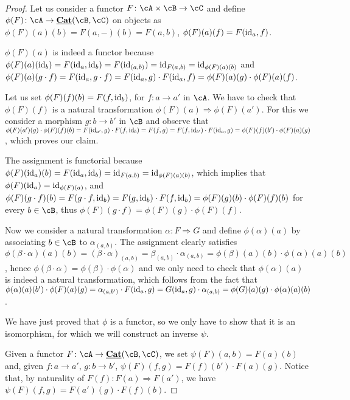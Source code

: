 \documentclass[a4paper,11pt,openany]{scrartcl}
\begin{document}
~\\
\begin{proof}
    Let us consider a functor $F\colon\cA\times\cB\rightarrow\cC$ and define
    $\phi(F)\colon\cA\rightarrow\underline{\Cat}(\cB,\cC)$ on objects as
    $\phi(F)(a)(b)=F(a,-)(b)=F(a,b)$, $\phi(F)(a)(f)=F(\operatorname{id}_a,f)$.

    $\phi(F)(a)$ is indeed a functor because
    $\phi(F)(a)(\operatorname{id}_b)=F(\operatorname{id}_a,\operatorname{id}_b)=F(\operatorname{id}_{(a,b)})=\operatorname{id}_{F(a,b)}=\operatorname{id}_{\phi(F)(a)(b)}$ and
    $\phi(F)(a)(g\cdot f)=F(\operatorname{id}_a,g\cdot f)=F(\operatorname{id}_a,g)\cdot
    F(\operatorname{id}_a,f)=\phi(F)(a)(g)\cdot\phi(F)(a)(f)$.

    Let us set $\phi(F)(f)(b)=F(f,\operatorname{id}_b)$, for $f\colon
    a\rightarrow a'$ in $\cA$. We have to check
    that $\phi(F)(f)$ is a natural transformation
    $\phi(F)(a)\Rightarrow\phi(F)(a')$. For this we consider a morphism $g\colon
    b\rightarrow b'$ in $\cB$ and observe that
    $\phi(F)(a')(g)\cdot\phi(F)(f)(b)=F(\operatorname{id}_{a'},g)\cdot
    F(f,\operatorname{id}_b)=F(f,g)=F(f,\operatorname{id}_{b'})\cdot
    F(\operatorname{id}_a,g)=\phi(F)(f)(b')\cdot\phi(F)(a)(g)$, which proves our claim.

    The assignment is functorial because
    $\phi(F)(\operatorname{id}_a)(b)=F(\operatorname{id}_a,\operatorname{id}_b)=\operatorname{id}_{F(a,b)}=\operatorname{id}_{\phi(F)(a)(b)}$, which implies that
    $\phi(F)(\operatorname{id}_a)=\operatorname{id}_{\phi(F)(a)}$, and
    $\phi(F)(g\cdot f)(b)=F(g\cdot f,\operatorname{id}_b)=F(g,\operatorname{id}_b)\cdot
    F(f,\operatorname{id}_b)=\phi(F)(g)(b)\cdot\phi(F)(f)(b)$ for every $b\in\cB$, thus
    $\phi(F)(g\cdot f)=\phi(F)(g)\cdot\phi(F)(f)$.

    Now we consider a natural transformation $\alpha\colon F\Rightarrow G$ and
    define $\phi(\alpha)(a)$ by associating $b\in\cB$ to $\alpha_{(a,b)}$. The
    assignment clearly satisfies
    $\phi(\beta\cdot\alpha)(a)(b)=(\beta\cdot\alpha)_{(a,b)}=\beta_{(a,b)}\cdot\alpha_{(a,b)}=\phi(\beta)(a)(b)\cdot\phi(\alpha)(a)(b)$,
    hence $\phi(\beta\cdot\alpha)=\phi(\beta)\cdot\phi(\alpha)$ and we only need to
    check that $\phi(\alpha)(a)$ is indeed a natural transformation, which
    follows from the fact that
    $\phi(\alpha)(a)(b')\cdot\phi(F)(a)(g)=\alpha_{(a,b')}\cdot
    F(\operatorname{id}_a,g)=G(\operatorname{id}_a,g)\cdot\alpha_{(a,b)}=\phi(G)(a)(g)\cdot\phi(\alpha)(a)(b)$.

        We have just proved that $\phi$ is a functor, so we only have to show
        that it is an isomorphism, for which we will construct an inverse
        $\psi$.

    Given a functor $F\colon\cA\rightarrow\underline{\Cat}(\cB,\cC)$, we set
    $\psi(F)(a,b)=F(a)(b)$ and, given $f\colon a\rightarrow a'$, $g\colon
    b\rightarrow b'$, $\psi(F)(f,g)=F(f)(b')\cdot F(a)(g)$. Notice that, by
    naturality of $F(f)\colon F(a)\Rightarrow F(a')$, we have
    $\psi(F)(f,g)=F(a')(g)\cdot F(f)(b)$.


\end{proof}
\end{document}
